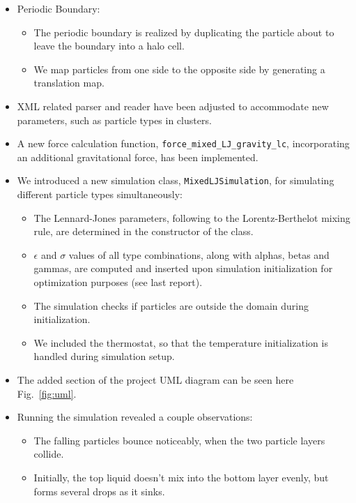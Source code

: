 \documentclass{article}
\begin{document}
    \begin{itemize}
        \item Periodic Boundary:
        \begin{itemize}
            \item The periodic boundary is realized by duplicating the particle about to leave the boundary into a halo cell.
            \item We map particles from one side to the opposite side by generating a translation map.
        \end{itemize}
        \item XML related parser and reader have been adjusted to accommodate new parameters, such as particle types in clusters.
        \item A new force calculation function, \texttt{force\_mixed\_LJ\_gravity\_lc}, incorporating an additional gravitational force, has been implemented.
        \item We introduced a new simulation class, \texttt{MixedLJSimulation}, for simulating different particle types simultaneously:
        \begin{itemize}
            \item The Lennard-Jones parameters, following to the Lorentz-Berthelot mixing rule, are determined in the constructor of the class.
            \item $\epsilon$ and $\sigma$ values of all type combinations, along with alphas, betas and gammas, are computed and inserted upon simulation initialization for optimization purposes (see last report).
            \item The simulation checks if particles are outside the domain during initialization.
            \item We included the thermostat, so that the temperature initialization is handled during simulation setup.
        \end{itemize}
        \item The added section of the project UML diagram can be seen here Fig.\ \ref{fig:uml}.
        \item Running the simulation revealed a couple observations:
        \begin{itemize}
            \item The falling particles bounce noticeably, when the two particle layers collide.
            \item Initially, the top liquid doesn't mix into the bottom layer evenly, but forms several drops as it sinks.
        \end{itemize}
    \end{itemize}
\end{document}
